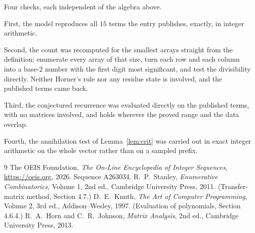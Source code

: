 \documentclass[11pt,a4paper]{article}
\theoremstyle{plain}
\theoremstyle{definition}
\begin{document}
Four checks, each independent of the algebra above.

First, the model reproduces all $15$ terms the entry publishes, exactly, in integer
arithmetic.

Second, the count was recomputed for the smallest arrays straight from the definition:
enumerate every array of that size, turn each row and each column into a base-$2$ number with
the first digit most significant, and test the divisibility directly. Neither Horner's rule nor
any residue state is involved, and the published terms came back.

Third, the conjectured recurrence was evaluated directly on the published terms, with no
matrices involved, and holds wherever the proved range and the data overlap.

Fourth, the annihilation test of Lemma~\ref{lem:crit} was carried out in exact integer
arithmetic on the whole vector rather than on a sampled prefix.

\begin{thebibliography}{9}
 The OEIS Foundation, \emph{The On-Line Encyclopedia of Integer
Sequences}, \url{https://oeis.org}, 2026. Sequence A263034.
 R.~P.~Stanley, \emph{Enumerative Combinatorics}, Volume 1, 2nd ed.,
Cambridge University Press, 2011. (Transfer-matrix method, Section 4.7.)
 D.~E.~Knuth, \emph{The Art of Computer Programming}, Volume 2, 3rd ed.,
Addison--Wesley, 1997. (Evaluation of polynomials, Section 4.6.4.)
 R.~A.~Horn and C.~R.~Johnson, \emph{Matrix Analysis}, 2nd ed., Cambridge
University Press, 2013.
\end{thebibliography}
\end{document}
